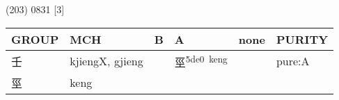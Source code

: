 \documentclass[14pt,a4paper]{scrartcl}
\begin{document}
(203) 0831 {[}3{]}

\begin{longtable}[c]{@{}llllll@{}}
\toprule
\begin{minipage}[b]{0.14\columnwidth}\raggedright\strut
GROUP
\strut\end{minipage} &
\begin{minipage}[b]{0.14\columnwidth}\raggedright\strut
MCH
\strut\end{minipage} &
\begin{minipage}[b]{0.14\columnwidth}\raggedright\strut
B
\strut\end{minipage} &
\begin{minipage}[b]{0.14\columnwidth}\raggedright\strut
A
\strut\end{minipage} &
\begin{minipage}[b]{0.14\columnwidth}\raggedright\strut
none
\strut\end{minipage} &
\begin{minipage}[b]{0.14\columnwidth}\raggedright\strut
PURITY
\strut\end{minipage}\tabularnewline
\midrule
\endhead
\begin{minipage}[t]{0.14\columnwidth}\raggedright\strut
壬
\strut\end{minipage} &
\begin{minipage}[t]{0.14\columnwidth}\raggedright\strut
kjiengX, gjieng
\strut\end{minipage} &
\begin{minipage}[t]{0.14\columnwidth}\raggedright\strut
\strut\end{minipage} &
\begin{minipage}[t]{0.14\columnwidth}\raggedright\strut
巠\textsuperscript{5de0~keng}
\strut\end{minipage} &
\begin{minipage}[t]{0.14\columnwidth}\raggedright\strut
\strut\end{minipage} &
\begin{minipage}[t]{0.14\columnwidth}\raggedright\strut
pure:A
\strut\end{minipage}\tabularnewline
\begin{minipage}[t]{0.14\columnwidth}\raggedright\strut
巠
\strut\end{minipage} &
\begin{minipage}[t]{0.14\columnwidth}\raggedright\strut
keng
\strut\end{minipage} &
\begin{minipage}[t]{0.14\columnwidth}\raggedright\strut

\end{minipage}
\end{longtable}
\end{document}
